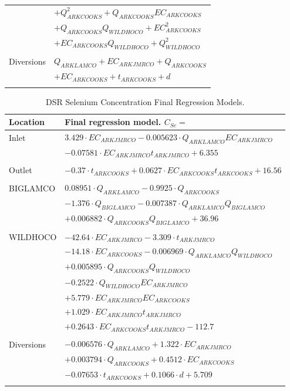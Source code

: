 \begin{linenumbers}
\begin{table}[htbp]
\begin{tabular}{ll}
					& $+ Q_{ARKCOOKS}^2+ Q_{ARKCOOKS} EC_{ARKCOOKS} $\\
					& $+ Q_{ARKCOOKS} Q_{WILDHOCO}+ EC_{ARKCOOKS}^2 $\\
					& $+ EC_{ARKCOOKS} Q_{WILDHOCO}+ Q_{WILDHOCO}^2$\\
	\\
	Diversions		& $Q_{ARKLAMCO} + EC_{ARKJMRCO} + Q_{ARKCOOKS}$ \\
					& $+ EC_{ARKCOOKS} + t_{ARKCOOKS} + d$\\
	\bottomrule \\
\end{tabular}
\end{table}

\begin{table}[htbp]
\centering
\caption{DSR Selenium Concentration Final Regression Models.}
\label{tab:DSRFinalRegression}
\begin{tabular}{ll}
	\toprule
	Location	& Final regression model.  $C_{Se}=$\\
	\midrule
	\midrule
	Inlet		& $3.429 \cdot EC_{ARKJMRCO} - 0.005623 \cdot Q_{ARKLAMCO}EC_{ARKJMRCO}$\\
					& $-0.07581 \cdot EC_{ARKJMRCO}t_{ARKJMRCO} + 6.355$\\
	\\
	Outlet		& $-0.37 \cdot t_{ARKCOOKS}+ 0.0627 \cdot EC_{ARKCOOKS}t_{ARKCOOKS} + 16.56$\\
	\\
	BIGLAMCO		& $0.08951 \cdot Q_{ARKLAMCO} -0.9925 \cdot Q_{ARKCOOKS}$\\
					& $-1.376 \cdot Q_{BIGLAMCO} -0.007387 \cdot Q_{ARKLAMCO}Q_{BIGLAMCO}$\\
					& $+0.006882 \cdot Q_{ARKCOOKS}Q_{BIGLAMCO} + 36.96$\\ 
	\\
	WILDHOCO		& $-42.64 \cdot EC_{ARKJMRCO} -3.309 \cdot t_{ARKJMRCO}$\\
					& $-14.18 \cdot EC_{ARKCOOKS} -0.006969 \cdot Q_{ARKLAMCO}Q_{WILDHOCO}$\\
					& $+0.005895 \cdot Q_{ARKCOOKS}Q_{WILDHOCO}$\\
					& $-0.2522 \cdot Q_{WILDHOCO}EC_{ARKJMRCO}$\\
					& $+5.779 \cdot EC_{ARKJMRCO}EC_{ARKCOOKS}$\\
					& $+1.029 \cdot EC_{ARKJMRCO}t_{ARKJMRCO}$\\
					& $+0.2643 \cdot EC_{ARKCOOKS}t_{ARKJMRCO} -112.7$\\
	\\
	Diversions		& $-0.006576 \cdot Q_{ARKLAMCO} +1.322 \cdot EC_{ARKJMRCO}$\\
					& $+0.003794 \cdot Q_{ARKCOOKS} +0.4512 \cdot EC_{ARKCOOKS}$\\
					& $-0.07653 \cdot t_{ARKCOOKS} +0.1066 \cdot d + 5.709$\\
	\bottomrule \\
\end{tabular}
\end{table}


\end{linenumbers}
